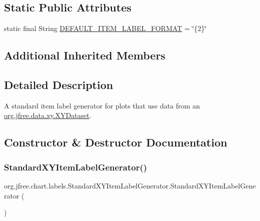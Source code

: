 \subsection*{Static Public Attributes}
\begin{DoxyCompactItemize}
\item 
static final String \mbox{\hyperlink{classorg_1_1jfree_1_1chart_1_1labels_1_1_standard_x_y_item_label_generator_a37bc6bdfd180e6cc3177631ed9f223cd}{D\+E\+F\+A\+U\+L\+T\+\_\+\+I\+T\+E\+M\+\_\+\+L\+A\+B\+E\+L\+\_\+\+F\+O\+R\+M\+AT}} = \char`\"{}\{2\}\char`\"{}
\end{DoxyCompactItemize}
\subsection*{Additional Inherited Members}


\subsection{Detailed Description}
A standard item label generator for plots that use data from an \mbox{\hyperlink{interfaceorg_1_1jfree_1_1data_1_1xy_1_1_x_y_dataset}{org.\+jfree.\+data.\+xy.\+X\+Y\+Dataset}}. 

\subsection{Constructor \& Destructor Documentation}
\mbox{\label{classorg_1_1jfree_1_1chart_1_1labels_1_1_standard_x_y_item_label_generator_a4da55462e798496717f4d9728b238258}} 
\subsubsection{\texorpdfstring{Standard\+X\+Y\+Item\+Label\+Generator()}{StandardXYItemLabelGenerator()}\hspace{0.1cm}{\footnotesize\ttfamily [1/6]}}
{\footnotesize\ttfamily org.\+jfree.\+chart.\+labels.\+Standard\+X\+Y\+Item\+Label\+Generator.\+Standard\+X\+Y\+Item\+Label\+Generator (\begin{DoxyParamCaption}{ }\end{DoxyParamCaption})}


